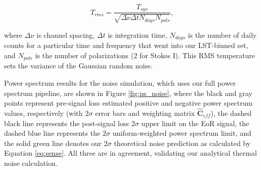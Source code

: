 \documentclass[preprint2,numberedappendix,tighten]{aastex6}  %
\begin{document}
\begin{equation}
\label{eq:noise}
T_{rms} = \frac{T_{sys}}{\sqrt{\Delta\nu \Delta t N_{days} N_{pols}}},
\end{equation}

\noindent where $\Delta\nu$ is channel spacing, $\Delta t$ is integration time, $N_{days}$ is the number of daily counts for a 
particular time and frequency that went into our LST-binned set, and $N_{pols}$ is the number of polarizations ($2$ for Stokes 
I). This RMS temperature sets the variance of the Gaussian random noise.

Power spectrum results for the noise simulation, which uses our full power spectrum pipeline, are shown in Figure 
\ref{fig:ps_noise}, where the black and gray points represent pre-signal loss estimated positive and negative power spectrum values, respectively (with 
$2\sigma$ error bars and weighting matrix $\widehat{\textbf{C}}_{eff}$), the dashed black line represents the post-signal loss $2\sigma$ upper limit on the EoR signal, the dashed blue line represents the $2\sigma$ uniform-weighted power 
spectrum limit, and the solid green line denotes our $2\sigma$ theoretical noise prediction as calculated by Equation 
\eqref{eq:sense}. All three are in agreement, validating our analytical thermal noise calculation. 
\end{document}
